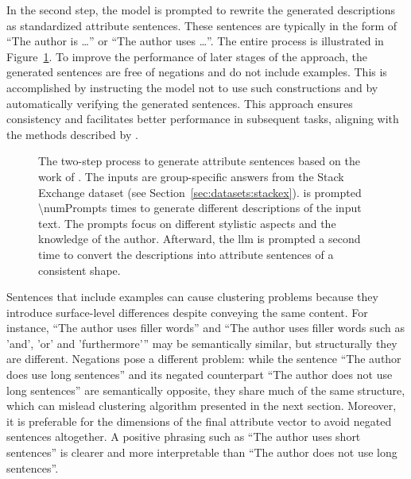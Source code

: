 In the second step, the model is prompted to rewrite the generated descriptions as standardized attribute sentences. These sentences are typically in the form of \enquote{The author is \ldots} or \enquote{The author uses \ldots}. The entire process is illustrated in Figure~\ref{fig:attributeSentenceGeneration}. To improve the performance of later stages of the approach, the generated sentences are free of negations and do not include examples. This is accomplished by instructing the model not to use such constructions and by automatically verifying the generated sentences. This approach ensures consistency and facilitates better performance in subsequent tasks, aligning with the methods described by \citet{patelLearningInterpretableStyle2023}.

\begin{figure}[ht]
  
  \caption{The two-step process to generate attribute sentences based on the work of \citet{patelLearningInterpretableStyle2023}. The inputs are group-specific answers from the Stack Exchange dataset (see Section~\ref{sec:datasets:stackex}).  is prompted \num{\numPrompts} times to generate different descriptions of the input text. The prompts focus on different stylistic aspects and the knowledge of the author. Afterward, the \ac{llm} is prompted a second time to convert the descriptions into attribute sentences of a consistent shape.}%
  \label{fig:attributeSentenceGeneration}
\end{figure}

Sentences that include examples can cause clustering problems because they introduce surface-level differences despite conveying the same content. For instance, \enquote{The author uses filler words} and \enquote{The author uses filler words such as 'and', 'or' and 'furthermore'} may be semantically similar, but structurally they are different. Negations pose a different problem: while the sentence \enquote{The author does use long sentences} and its negated counterpart \enquote{The author does not use long sentences} are semantically opposite, they share much of the same structure, which can mislead clustering algorithm presented in the next section. Moreover, it is preferable for the dimensions of the final attribute vector to avoid negated sentences altogether. A positive phrasing such as \enquote{The author uses short sentences} is clearer and more interpretable than \enquote{The author does not use long sentences}. %

